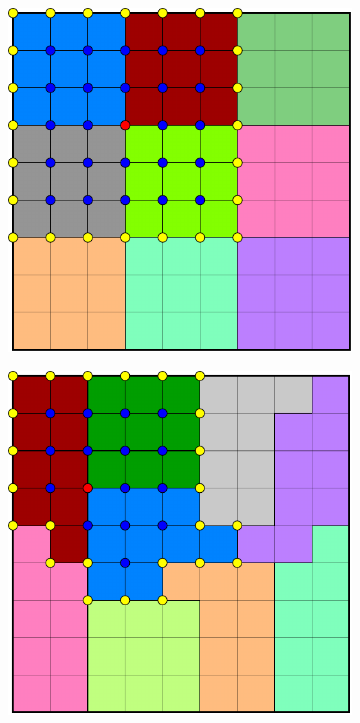 \begin{figure}[htbp]
  \begin{subfigure}[t]{0.3\textwidth}
    \centerline{\includegraphics[width=0.9\linewidth]{figs/square_cart_struct_node_supp}}
  \end{subfigure}
  \hfill
  \begin{subfigure}[t]{0.3\textwidth}
    \centerline{\includegraphics[width=0.9\linewidth]{figs/square_cart_metis_node_supp}}

\end{subfigure}
\end{figure}
